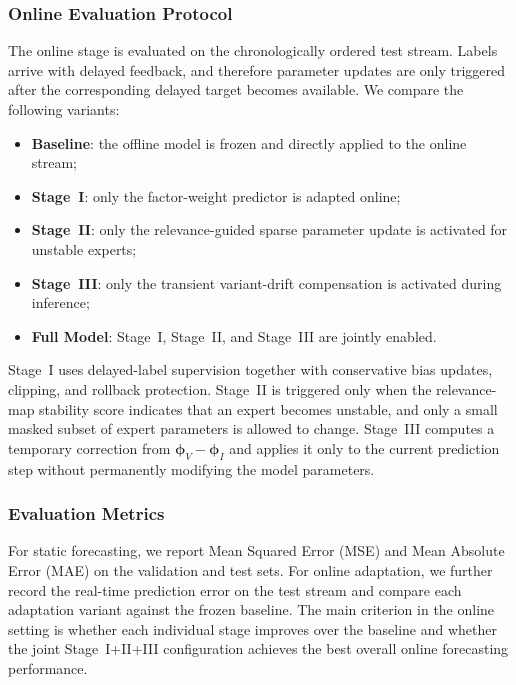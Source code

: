 ﻿\documentclass[journal]{IEEEtran}
\newenvironment{auditproblemblock}{\begingroup\color{red}}{\endgroup}
\begin{document}
\begin{auditproblemblock}
\subsubsection{Online Evaluation Protocol}
The online stage is evaluated on the chronologically ordered test stream. Labels arrive with delayed feedback, and therefore parameter updates are only triggered after the corresponding delayed target becomes available. We compare the following variants:
\begin{itemize}
\item \textbf{Baseline}: the offline model is frozen and directly applied to the online stream;
\item \textbf{Stage~I}: only the factor-weight predictor is adapted online;
\item \textbf{Stage~II}: only the relevance-guided sparse parameter update is activated for unstable experts;
\item \textbf{Stage~III}: only the transient variant-drift compensation is activated during inference;
\item \textbf{Full Model}: Stage~I, Stage~II, and Stage~III are jointly enabled.
\end{itemize}

Stage~I uses delayed-label supervision together with conservative bias updates, clipping, and rollback protection. Stage~II is triggered only when the relevance-map stability score indicates that an expert becomes unstable, and only a small masked subset of expert parameters is allowed to change. Stage~III computes a temporary correction from $\boldsymbol{\phi}_V-\boldsymbol{\phi}_I$ and applies it only to the current prediction step without permanently modifying the model parameters.

\subsubsection{Evaluation Metrics}
For static forecasting, we report Mean Squared Error (MSE) and Mean Absolute Error (MAE) on the validation and test sets. For online adaptation, we further record the real-time prediction error on the test stream and compare each adaptation variant against the frozen baseline. The main criterion in the online setting is whether each individual stage improves over the baseline and whether the joint Stage~I+II+III configuration achieves the best overall online forecasting performance.


\end{auditproblemblock}
\end{document}
